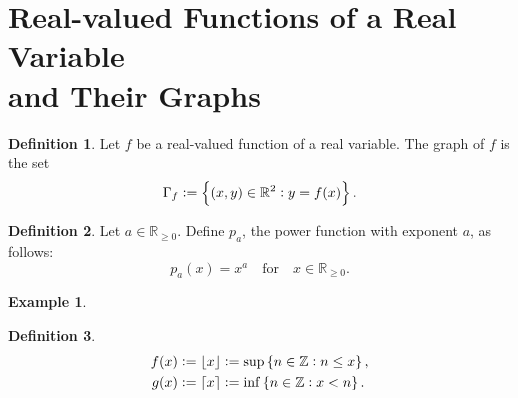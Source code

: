 \documentclass[12pt,openany]{book}
\DeclarePairedDelimiter{\ceil}{\lceil}{\rceil}
\DeclarePairedDelimiter{\floor}{\lfloor}{\rfloor}
\theoremstyle{definition}
\newtheorem{definition}{Definition}[chapter]
\newtheorem{example}{Example}[chapter]
\newcommand{\Z}{\mathbb{Z}}
\newcommand{\R}{\mathbb{R}}
\begin{document}
	\section{Real-valued Functions of a Real Variable\\ and Their Graphs}
	
	\begin{tcolorbox}[colframe=defcolor,title={\color{white}\bf Graph}]
		\begin{definition}
			Let $f$ be a real-valued function of a real variable. The graph of $f$ is the set \[
			\Gamma_f:=\set{(x,y)\in\R^2:y=f(x)}.
			\]
		\end{definition}
	\end{tcolorbox}
	\vspace{8pt}
	\begin{tcolorbox}[colframe=defcolor,title={\color{white}\bf Power Function}]
		\begin{definition}
			Let $a\in\R_{\geq 0}$. Define $p_a$, the power function with exponent $a$, as follows: \[
			p_a(x)=x^a\quad\text{for}\quad x\in\R_{\geq 0}.
			\]
		\end{definition}
	\end{tcolorbox}
	\begin{example}
		\ \begin{center}
		\end{center}
	\end{example}
	\vspace{8pt}
	\begin{tcolorbox}[colframe=defcolor,title={\color{white}\bf The Floor and Ceiling Function}]
		\begin{definition}
			\begin{align*}
				f(x)&:=\floor*{x}:=\sup\set{n\in\Z:n\leq x},\\
				g(x)&:=\ceil*{x}:=\inf\set{n\in\Z:x<n}.
			\end{align*}
		\end{definition}
	\end{tcolorbox}
\end{document}
